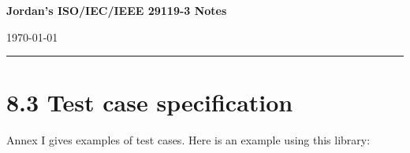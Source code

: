 \usepackage[
letterpaper,
margin=1in
]{geometry}

\usepackage[]{embedfile}

\pagestyle{empty}


	{\LARGE\bfseries Jordan's ISO/IEC/IEEE 29119-3 Notes}
	
	\vspace{0.25em}
	
	{\small \today}
	
	\hrule 
	
	\def\TCID{TC-001}

	\def\TCTitle{Power-On Self Test}

	\def\TCPurpose{
		Verify the device successfully completes boot.
	}

	\def\TCPriority{\TCPriorityHigh}

	\def\TCRequirementRef{REQ-001}

	\def\TCPreconditions{
		Device connected to nominal power source.
	}

	\def\TCEnvironment{
		Laboratory ambient conditions.
	}
	
	\def\TCInputData{
		No operator input required.
	}

	\def\TCProcedure{
		\newline
		\begin{enumerate}
			\item Apply power.
			\item Observe startup sequence.
			\item Wait for initialization to complete.
		\end{enumerate}
	}

	\def\TCExpectedResult{
		Device reaches operational state with no errors.
	}

	\def\TCPostConditions{
		Device remains operational.
	}
	\section*{8.3 Test case specification}
	Annex I gives examples of test cases. Here is an example using this library:
	\TCTemplate

\fi

